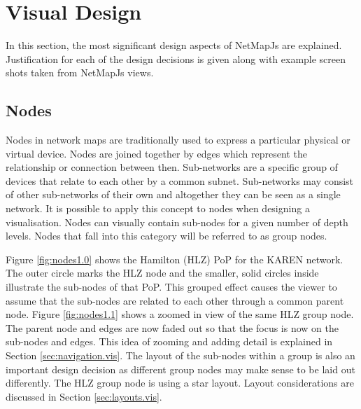 \documentclass[11pt, a4paper]{article}
\begin{document}
\newpage

\section{Visual Design} 
\label{sec:visual-design}

In this section, the most significant design aspects of NetMapJs are explained.
Justification for each of the design decisions is given along with example
screen shots taken from NetMapJs views.

\subsection{Nodes}
\label{sec:nodes.vis}


Nodes in network maps are traditionally used to express a particular physical or
virtual device. Nodes are joined together by edges which represent the
relationship or connection between then. Sub-networks are a specific group of
devices that relate to each other by a common subnet. Sub-networks may consist of
other sub-networks of their own and altogether they can be seen as a single
network. It is possible to apply this concept to nodes when designing a
visualisation. Nodes can visually contain sub-nodes for a given number
of depth levels. Nodes that fall into this category will be referred to as
group nodes.

Figure \ref{fig:nodes1.0} shows the Hamilton (HLZ) PoP for the KAREN network.
The outer circle marks the HLZ node and the smaller, solid circles inside
illustrate the sub-nodes of that PoP. This grouped effect causes the viewer to
assume that the sub-nodes are related to each other through a common parent
node. Figure \ref{fig:nodes1.1} shows a zoomed in view of the same HLZ group
node. The parent node and edges are now faded out so that the focus is now on
the sub-nodes and edges. This idea of zooming and adding detail is explained in
Section \ref{sec:navigation.vis}. The layout of the sub-nodes within a group is
also an important design decision as different group nodes may make sense to be
laid out differently. The HLZ group node is using a star layout. Layout
considerations are discussed in Section \ref{sec:layouts.vis}.
\end{document}
